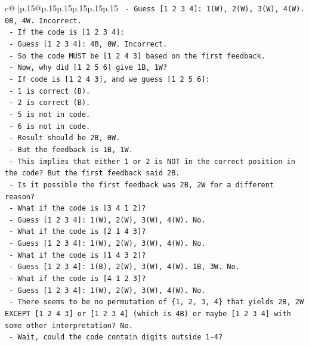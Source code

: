 \documentclass{article}
\begin{document}
{\begin{supertabular}{c@{$\;$}|p{.15\linewidth}@{}p{.15\linewidth}p{.15\linewidth}p{.15\linewidth}p{.15\linewidth}p{.15\linewidth}}
{{{\texttt{        {-} Guess {[}1 2 3 4{]}: 1(W), 2(W), 3(W), 4(W). 0B, 4W. Incorrect.} \\
\texttt{      {-} If the code is {[}1 2 3 4{]}:} \\
\texttt{        {-} Guess {[}1 2 3 4{]}: 4B, 0W. Incorrect.} \\
\texttt{      {-} So the code MUST be {[}1 2 4 3{]} based on the first feedback.} \\
\texttt{    {-} Now, why did {[}1 2 5 6{]} give 1B, 1W?} \\
\texttt{      {-} If code is {[}1 2 4 3{]}, and we guess {[}1 2 5 6{]}:} \\
\texttt{        {-} 1 is correct (B).} \\
\texttt{        {-} 2 is correct (B).} \\
\texttt{        {-} 5 is not in code.} \\
\texttt{        {-} 6 is not in code.} \\
\texttt{        {-} Result should be 2B, 0W.} \\
\texttt{      {-} But the feedback is 1B, 1W.} \\
\texttt{      {-} This implies that either 1 or 2 is NOT in the correct position in the code? But the first feedback said 2B.} \\
\texttt{      {-} Is it possible the first feedback was 2B, 2W for a different reason?} \\
\texttt{      {-} What if the code is {[}3 4 1 2{]}?} \\
\texttt{        {-} Guess {[}1 2 3 4{]}: 1(W), 2(W), 3(W), 4(W). No.} \\
\texttt{      {-} What if the code is {[}2 1 4 3{]}?} \\
\texttt{        {-} Guess {[}1 2 3 4{]}: 1(W), 2(W), 3(W), 4(W). No.} \\
\texttt{      {-} What if the code is {[}1 4 3 2{]}?} \\
\texttt{        {-} Guess {[}1 2 3 4{]}: 1(B), 2(W), 3(W), 4(W). 1B, 3W. No.} \\
\texttt{      {-} What if the code is {[}4 1 2 3{]}?} \\
\texttt{        {-} Guess {[}1 2 3 4{]}: 1(W), 2(W), 3(W), 4(W). No.} \\
\texttt{      {-} There seems to be no permutation of \{1, 2, 3, 4\} that yields 2B, 2W EXCEPT {[}1 2 4 3{]} or {[}1 2 3 4{]} (which is 4B) or maybe {[}1 2 3 4{]} with some other interpretation? No.} \\
\texttt{      {-} Wait, could the code contain digits outside 1{-}4?} \\
}}}
\end{supertabular}}
\end{document}
